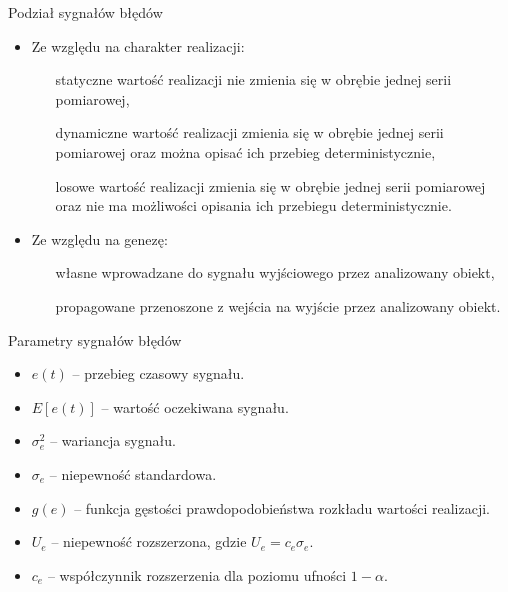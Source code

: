 \documentclass[12pt, polish, aspectratio = 169]{slides}
\begin{document}
\begin{frame}{Podział sygnałów błędów}
\begin{itemize}
\item Ze względu na charakter realizacji:
	\begin{itemize}
	\item[statyczne] wartość realizacji nie zmienia się w obrębie jednej serii pomiarowej,
	\item[dynamiczne] wartość realizacji zmienia się w obrębie jednej serii pomiarowej oraz można opisać ich przebieg deterministycznie,
	\item[losowe] wartość realizacji zmienia się w obrębie jednej serii pomiarowej oraz nie ma możliwości opisania ich przebiegu deterministycznie.
	\end{itemize}
\item Ze względu na genezę:
	\begin{itemize}
	\item [własne] wprowadzane do sygnału wyjściowego przez analizowany obiekt,
	\item [propagowane] przenoszone z wejścia na wyjście przez analizowany obiekt.
	\end{itemize}
\end{itemize}
\end{frame}

\begin{frame}{Parametry sygnałów błędów}
\begin{itemize}
\item $e(t)$ -- przebieg czasowy sygnału.
\item $E[e(t)]$ -- wartość oczekiwana sygnału.
\item $\sigma^{2}_{e}$ -- wariancja sygnału.
\item $\sigma_{e}$ -- niepewność standardowa.
\item $g(e)$ -- funkcja gęstości prawdopodobieństwa rozkładu wartości realizacji.
\item $U_{e}$ -- niepewność rozszerzona, gdzie $U_{e} = c_{e} \sigma_{e}$.
\item $c_{e}$ -- współczynnik rozszerzenia dla poziomu ufności $1 - \alpha$.
\end{itemize}
\end{frame}
\end{document}
